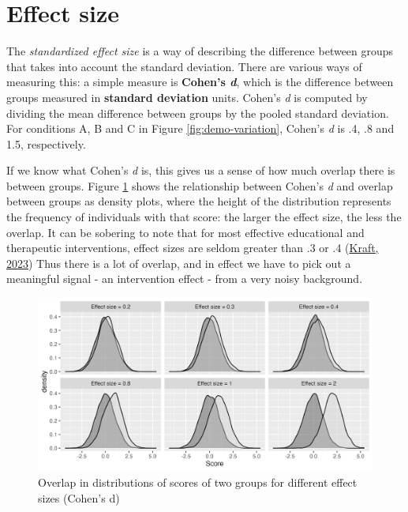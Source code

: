 \documentclass{krantz}
\begin{document}
\hypertarget{effect-size}{%
\section{Effect size}\label{effect-size}}

The \emph{standardized effect size}  is a way of describing the difference between groups that takes into account the standard deviation. There are various ways of measuring this: a simple measure is \textbf{Cohen's \emph{d}}, which is the difference between groups measured in \textbf{standard deviation} units. Cohen's \emph{d} is computed by dividing the mean difference between groups by the pooled standard deviation. For conditions A, B and C in Figure \ref{fig:demo-variation}, Cohen's \emph{d} is .4, .8 and 1.5, respectively.

If we know what Cohen's \emph{d} is, this gives us a sense of how much overlap there is between groups. Figure \ref{fig:effsizefig} shows the relationship between Cohen's \emph{d} and overlap between groups as density plots, where the height of the distribution represents the frequency of individuals with that score: the larger the effect size, the less the overlap. It can be sobering to note that for most effective educational and therapeutic interventions, effect sizes are seldom greater than .3 or .4 (\protect\hyperlink{ref-kraft2023}{Kraft, 2023}) Thus there is a lot of overlap, and in effect we have to pick out a meaningful signal - an intervention effect - from a very noisy background.

\begin{figure}
\includegraphics[width=1\linewidth]{images_bw/densityplot} \caption{Overlap in distributions of scores of two groups for different effect sizes (Cohen's d)}\label{fig:effsizefig}
\end{figure}
\end{document}
